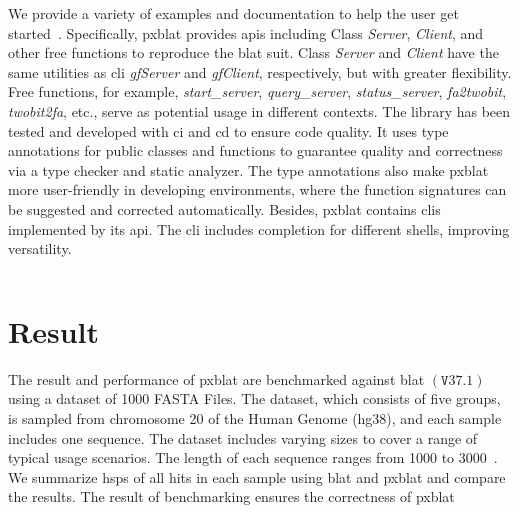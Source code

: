 We provide a variety of examples and documentation to help the user get started~.
Specifically, \gls{pxblat} provides \glspl{api} including Class \emph{Server}, \emph{Client}, and other free functions to reproduce the \gls{blat} suit.
Class \emph{Server} and \emph{Client} have the same utilities as \gls{cli} \emph{gfServer} and \emph{gfClient}, respectively, but with greater flexibility.
Free functions, for example, \emph{start\_server}, \emph{query\_server}, \emph{status\_server}, \emph{fa2twobit}, \emph{twobit2fa}, etc., serve as potential usage in different contexts.
The library has been tested and developed with \gls{ci} and \gls{cd} to ensure code quality.
It uses type annotations for public classes and functions to guarantee quality and correctness via a type checker and static analyzer.
The type annotations also make \gls{pxblat} more user-friendly in developing environments, where the function signatures can be suggested and corrected automatically.
Besides, \gls{pxblat} contains \glspl{cli} implemented by its \gls{api}.
The \gls{cli} includes completion for different shells, improving versatility.

\begin{listing}
	\inputminted[linenos, breaklines]{python}{codes/example1.py}
	\label{listing:example}
\end{listing}


\section*{Result}\label{sec:result}

The result and performance of \gls{pxblat} are benchmarked against \gls{blat} \(\left(\mathtt{V}37.1\right)\) using a dataset of \num[round-mode=places, round-precision=0]{1000} FASTA Files.
The dataset, which consists of five groups, is sampled from chromosome \num[round-mode=places, round-precision=0]{20} of the Human Genome (hg38), and each sample includes one sequence.
The dataset includes varying sizes to cover a range of typical usage scenarios.
The length of each sequence ranges from \num[round-mode=places, round-precision=0]{1000} to \num[round-mode=places, round-precision=0]{3000}~.
We summarize \glspl{hsp} of all hits in each sample using \gls{blat} and \gls{pxblat} and compare the results.
The result of benchmarking ensures the correctness of \gls{pxblat}~

